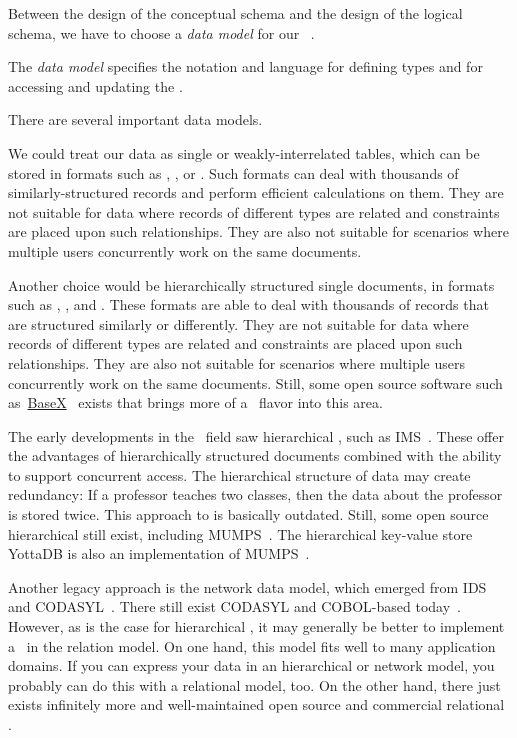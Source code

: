 %
\label{sec:dbModelSelection}%
%
Between the design of the conceptual schema and the design of the logical schema, we have to choose a \emph{data model} for our \db~\cite{SS2005EIDDDFDB:I}.%
%
\begin{definition}%
The \emph{data model} specifies the notation and language for defining types and for accessing and updating the \db.%
\end{definition}%
%
There are several important data models.

We could treat our data as single or weakly-interrelated tables, which can be stored in formats such as , , or .
Such formats can deal with thousands of similarly-structured records and perform efficient calculations on them.
They are not suitable for data where records of different types are related and constraints are placed upon such relationships.
They are also not suitable for scenarios where multiple users concurrently work on the same documents.

Another choice would be hierarchically structured single documents, in formats such as , , and .
These formats are able to deal with thousands of records that are structured similarly or differently.
They are not suitable for data where records of different types are related and constraints are placed upon such relationships.
They are also not suitable for scenarios where multiple users concurrently work on the same documents.
Still, some open source software such as~\href{https://basex.org}{BaseX}~\cite{GHS2010B,G2006PXMMDTTL} exists that brings more of a \db\ flavor into this area.

The early developments in the \db\ field saw hierarchical , such as IMS~\cite{KLBGNLWBS2012ITIYCGTIIMS,BBP2007TBOI,KC2024DS:ITD}.
These offer the advantages of hierarchically structured documents combined with the ability to support concurrent access.
The hierarchical structure of data may create redundancy:
If a professor teaches two classes, then the data about the professor is stored twice.
This approach to  is basically outdated.
Still, some open source hierarchical  still exist, including MUMPS~\cite{O2008TMPL,O2025TMPL}.
The hierarchical key-value store YottaDB is also an implementation of MUMPS~\cite{B2018THALOMMATFOY}.

Another legacy approach is the network data model, which emerged from IDS~\cite{B2009TOOTIDSITFDAD,B1965SFRAP,H2016HCBITDAFOODW} and CODASYL~\cite{TF1976CDBMS}.
There still exist CODASYL and COBOL-based  today~\cite{O2022OCDDARM}.
However, as is the case for hierarchical , it may generally be better to implement a \db\ in the relation model.
On one hand, this model fits well to many application domains.
If you can express your data in an hierarchical or network model, you probably can do this with a relational model, too.
On the other hand, there just exists infinitely more and well-maintained open source and commercial relational .

